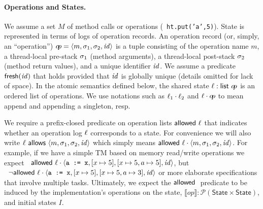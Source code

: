 \paragraph{Operations and States.}
We assume a set $M$ of method calls or operations (\eg\
  \texttt{ht.put('a',5)}).
%
State is represented in terms of
logs of operation records. An operation record (or, simply, an ``operation'')
$
    o\!p = \langle m, \sigma_1, \sigma_2, \mathit{id} \rangle
$
is a tuple consisting of the operation name $m$, 
a thread-local pre-stack $\sigma_1$ (method arguments),
a thread-local post-stack $\sigma_2$ (method return values),
and a unique identifier $\mathit{id}$.
%
We assume a predicate $\textsf{fresh}(\mathit{id})$ that holds provided that $\mathit{id}$
is globally unique (details omitted for lack of space).
%
In the atomic semantics defined below, the shared state $\ell :
\textsf{list } o\!p$ is an ordered list of operations.
%
We use notations such as $\ell_1\cdot\ell_2$ and $\ell\cdot o\!p$ to
mean append and appending a singleton, resp.

We require a prefix-closed predicate on operation lists $\textsf{allowed}\ \ell$
that indicates whether an operation log $\ell$ corresponds to a state.
%
For convenience we will also write $\ell \textsf{ allows } \langle m, \sigma_1,
\sigma_2, \mathit{id}\rangle$ which simply means 
$\textsf{allowed}\ \ell \cdot \langle m, \sigma_1,\sigma_2, \mathit{id}\rangle$.
%
For example, if we have a simple TM
based on memory read/write operations we expect
$\;\;\textsf{allowed}\ \ell\cdot \langle \texttt{a := x}, [x \mapsto 5], [x
  \mapsto 5, a \mapsto 5], \mathit{id}\rangle$,
but 
$\;\;\neg \textsf{allowed}\ \ell\cdot \langle \texttt{a := x}, [x \mapsto 5], [x
  \mapsto 5, a \mapsto 3], \mathit{id}\rangle$ or more elaborate
specifications that involve multiple tasks.
%
Ultimately, we expect the $\textsf{allowed}\ $ predicate to be induced by the
implementation's operations on the state, $\llbracket op\rrbracket :
\mathcal{P}(\mathsf{State} \times \mathsf{State})$, and initial
states $I$. 

